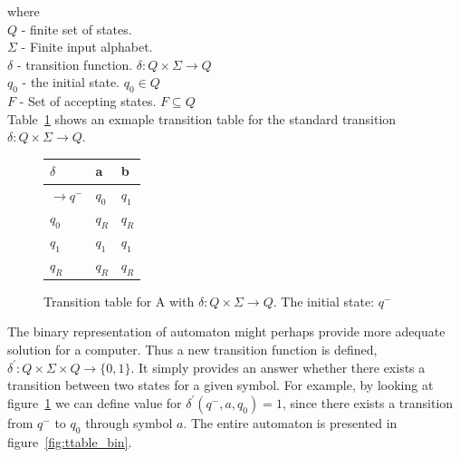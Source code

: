 \documentclass{mini}
\begin{document}
where \\
$Q$ - finite set of states. \\
$\Sigma$ - Finite input alphabet. \\
$\delta$ - transition function. $\delta: Q \times \Sigma \rightarrow Q$ \\
$q_0$ - the initial state. $q_0 \in Q$ \\
$F$ - Set of accepting states. $F \subseteq Q$ \\

Table~\ref{fig:ttable_std} shows an exmaple transition table for the standard transition $\delta: Q \times \Sigma \rightarrow Q$.

%
%
\begin{figure}[H]
    \CenterFloatBoxes
    \begin{floatrow}
        
        \ttabbox
        {
            \centering
            \setlength{\tabcolsep}{15pt}
            \renewcommand{\arraystretch}{1.5}
            \begin{tabular}{|P{1.0cm} || P{0.6cm} | P{0.6cm} |}
                \hline
                $\delta$ & a & b \\
                \hline
                \hline
                $\rightarrow$$q^-$ 		& $q_0$ & $q_1$ \\
                \hline
                $q_0 $ 		& $q_R$ & $q_R$ \\
                \hline
                $q_1 $ 		& $q_1$ & $q_1$ \\
                \hline
                $q_R$  					& $q_R$ & $q_R$ \\
                \hline
            \end{tabular}
        }
        {\caption{Transition table for A with $\delta: Q \times \Sigma \rightarrow Q$. The initial state: $q^-$}\label{fig:ttable_std}}
        
        
    \end{floatrow}
\end{figure}


The binary representation of automaton might perhaps provide more adequate solution for a computer. Thus a new transition function is defined, $\delta^{'}: Q \times \Sigma \times Q \rightarrow \{0,1\}$. It simply provides an answer whether there exists a transition between two states for a given symbol. For example, by looking at figure~\ref{fig:ttable_std} we can define value for $\delta^{'}(q^-,a,q_0) = 1$, since there exists a transition from $q^-$ to $q_0$ through symbol $a$. The entire automaton is presented in figure~\ref{fig:ttable_bin}.
\end{document}
